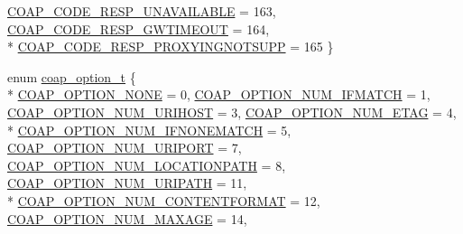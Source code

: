 \begin{DoxyCompactItemize}
\hyperlink{group__open_coap_ggae99fde61d59e68af70c6bcd0c7b0256fafe0932a9eccda4acd776bf29c89276b1}{C\+O\+A\+P\+\_\+\+C\+O\+D\+E\+\_\+\+R\+E\+S\+P\+\_\+\+U\+N\+A\+V\+A\+I\+L\+A\+B\+LE} = 163, 
\hyperlink{group__open_coap_ggae99fde61d59e68af70c6bcd0c7b0256fa8ff33be7084159f8fc5594e6f41e3740}{C\+O\+A\+P\+\_\+\+C\+O\+D\+E\+\_\+\+R\+E\+S\+P\+\_\+\+G\+W\+T\+I\+M\+E\+O\+UT} = 164, 
\\*
\hyperlink{group__open_coap_ggae99fde61d59e68af70c6bcd0c7b0256fa5acd962d666c451c0053b86555e39f09}{C\+O\+A\+P\+\_\+\+C\+O\+D\+E\+\_\+\+R\+E\+S\+P\+\_\+\+P\+R\+O\+X\+Y\+I\+N\+G\+N\+O\+T\+S\+U\+PP} = 165
 \}
\item 
enum \hyperlink{group__open_coap_ga809c9a7522aa7e4726b4a95ccdb2833b}{coap\+\_\+option\+\_\+t} \{ \\*
\hyperlink{group__open_coap_gga809c9a7522aa7e4726b4a95ccdb2833ba6f1c9871b73e1ce158e1f671393cdcdc}{C\+O\+A\+P\+\_\+\+O\+P\+T\+I\+O\+N\+\_\+\+N\+O\+NE} = 0, 
\hyperlink{group__open_coap_gga809c9a7522aa7e4726b4a95ccdb2833ba9f7901f5b91c312b84adfa610ffdfce7}{C\+O\+A\+P\+\_\+\+O\+P\+T\+I\+O\+N\+\_\+\+N\+U\+M\+\_\+\+I\+F\+M\+A\+T\+CH} = 1, 
\hyperlink{group__open_coap_gga809c9a7522aa7e4726b4a95ccdb2833baa8389f3015218b9b418e89d1214f18a7}{C\+O\+A\+P\+\_\+\+O\+P\+T\+I\+O\+N\+\_\+\+N\+U\+M\+\_\+\+U\+R\+I\+H\+O\+ST} = 3, 
\hyperlink{group__open_coap_gga809c9a7522aa7e4726b4a95ccdb2833ba9d495f2b02838985081c1e470a04feb2}{C\+O\+A\+P\+\_\+\+O\+P\+T\+I\+O\+N\+\_\+\+N\+U\+M\+\_\+\+E\+T\+AG} = 4, 
\\*
\hyperlink{group__open_coap_gga809c9a7522aa7e4726b4a95ccdb2833baa0efddd89894e9d5499fb6104ade8181}{C\+O\+A\+P\+\_\+\+O\+P\+T\+I\+O\+N\+\_\+\+N\+U\+M\+\_\+\+I\+F\+N\+O\+N\+E\+M\+A\+T\+CH} = 5, 
\hyperlink{group__open_coap_gga809c9a7522aa7e4726b4a95ccdb2833ba6471be06a48e3bffb30274052ee3381c}{C\+O\+A\+P\+\_\+\+O\+P\+T\+I\+O\+N\+\_\+\+N\+U\+M\+\_\+\+U\+R\+I\+P\+O\+RT} = 7, 
\hyperlink{group__open_coap_gga809c9a7522aa7e4726b4a95ccdb2833ba4ee718814051f694c7ae236965c6536f}{C\+O\+A\+P\+\_\+\+O\+P\+T\+I\+O\+N\+\_\+\+N\+U\+M\+\_\+\+L\+O\+C\+A\+T\+I\+O\+N\+P\+A\+TH} = 8, 
\hyperlink{group__open_coap_gga809c9a7522aa7e4726b4a95ccdb2833ba38d8e0fc51d8055261081086cf0691cb}{C\+O\+A\+P\+\_\+\+O\+P\+T\+I\+O\+N\+\_\+\+N\+U\+M\+\_\+\+U\+R\+I\+P\+A\+TH} = 11, 
\\*
\hyperlink{group__open_coap_gga809c9a7522aa7e4726b4a95ccdb2833bae59c8e513355b8fa14ea7149971f3a00}{C\+O\+A\+P\+\_\+\+O\+P\+T\+I\+O\+N\+\_\+\+N\+U\+M\+\_\+\+C\+O\+N\+T\+E\+N\+T\+F\+O\+R\+M\+AT} = 12, 
\hyperlink{group__open_coap_gga809c9a7522aa7e4726b4a95ccdb2833ba5da32446e8a58275277ec87556c1d457}{C\+O\+A\+P\+\_\+\+O\+P\+T\+I\+O\+N\+\_\+\+N\+U\+M\+\_\+\+M\+A\+X\+A\+GE} = 14, 

\end{DoxyCompactItemize}
